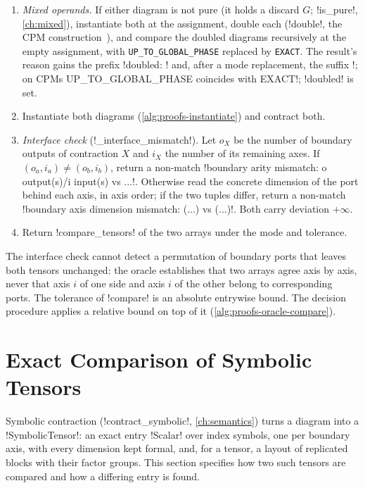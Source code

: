 \begin{algorithm}\label{alg:proofs-compare}
\leavevmode
\begin{enumerate}
\item \emph{Mixed operands.} If either diagram is not pure (it holds a discard $G$; \py!is_pure!, \cref{ch:mixed}), instantiate both at the assignment, double each (\py!double!, the CPM construction~\cite{selinger2007cpm,carette2019mixed}), and compare the doubled diagrams recursively at the empty assignment, with \texttt{UP\_TO\_GLOBAL\_PHASE} replaced by \texttt{EXACT}. The result's reason gains the prefix \code!doubled: ! and, after a mode replacement, the suffix \code!; on CPMs UP_TO_GLOBAL_PHASE coincides with EXACT!; \py!doubled! is set.
\item Instantiate both diagrams (\cref{alg:proofs-instantiate}) and contract both.
\item \emph{Interface check} (\py!_interface_mismatch!). Let $o_X$ be the number of boundary outputs of contraction $X$ and $i_X$ the number of its remaining axes. If $(o_a,i_a)\neq(o_b,i_b)$, return a non-match \code!boundary arity mismatch: o output(s)/i input(s) vs ...!. Otherwise read the concrete dimension of the port behind each axis, in axis order; if the two tuples differ, return a non-match \code!boundary axis dimension mismatch: (...) vs (...)!. Both carry deviation $+\infty$.
\item Return \py!compare_tensors! of the two arrays under the mode and tolerance.
\end{enumerate}
\end{algorithm}

The interface check cannot detect a permutation of boundary ports that leaves both tensors unchanged: the oracle establishes that two arrays agree axis by axis, never that axis $i$ of one side and axis $i$ of the other belong to corresponding ports. The tolerance of \py!compare! is an absolute entrywise bound. The decision procedure applies a relative bound on top of it (\cref{alg:proofs-oracle-compare}).

\section{Exact Comparison of Symbolic Tensors}\label{sec:proofs-symbolic}

Symbolic contraction (\py!contract_symbolic!, \cref{ch:semantics}) turns a diagram into a \py!SymbolicTensor!: an exact entry \py!Scalar! over index symbols, one per boundary axis, with every dimension kept formal, and, for a  tensor, a layout of replicated blocks with their factor groups. This section specifies how two such tensors are compared and how a differing entry is found.

